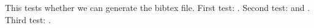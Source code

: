 \documentclass{article}
\begin{document}
This tests whether we can generate the bibtex file.
First test: \cite{bib:dcicpp}.
Second test: \cite{bib:gotoblas} and \cite{bib:lancelot}.
Third test: \cite{bib:book-nocedal,bib:steihaug, bib:hs}.



\end{document}
